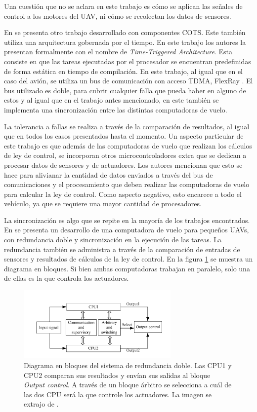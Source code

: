 Una cuestión que no se aclara en este trabajo es cómo se aplican las señales de control a los motores del UAV, ni cómo se recolectan los datos de sensores.

En \cite{zhang2020architecture} se presenta otro trabajo desarrollado con componentes COTS. Este también utiliza una arquitectura gobernada por el tiempo. En este trabajo los autores la presentan formalmente con el nombre de \textit{Time-Triggered Architecture}. Esta consiste en que las tareas ejecutadas por el procesador se encuentran predefinidas de forma estática en tiempo de compilación. En este trabajo, al igual que en el caso del avión, se utiliza un bus de comunicación con acceso TDMA, FlexRay \cite{nxpAN12233}. El bus utilizado es doble, para cubrir cualquier falla que pueda haber en alguno de estos y al igual que en el trabajo antes mencionado, en este también se implementa una sincronización entre las distintas computadoras de vuelo.

La tolerancia a fallas se realiza a través de la comparación de resultados, al igual que en todos los casos presentados hasta el momento. Un aspecto particular de este trabajo es que además de las computadoras de vuelo que realizan los cálculos de ley de control, se incorporan otros microcontroladores extra que se dedican a procesar datos de sensores y de actuadores. Los autores mencionan que esto se hace para alivianar la cantidad de datos enviados a través del bus de comunicaciones y el procesamiento que deben realizar las computadoras de vuelo para calcular la ley de control. Como aspecto negativo, esto encarece a todo el vehículo, ya que se requiere una mayor cantidad de procesadores.

La sincronización es algo que se repite en la mayoría de los trabajos encontrados. En \cite{zhang2015dual} se presenta un desarrollo de una computadora de vuelo para pequeños UAVs, con redundancia doble y sincronización en la ejecución de las tareas. La redundancia también se administra a través de la comparación de entradas de sensores y resultados de cálculos de la ley de control. En la figura \ref{fig:FCC_dual_FPGA} se muestra un diagrama en bloques. Si bien ambas computadoras trabajan en paralelo, solo una de ellas es la que controla los actuadores. 

\begin{figure}[H]
    \centering
    \includegraphics[width=0.7\textwidth]{img/FCC_dual_FPGA.png}
    \caption{Diagrama en bloques del sistema de redundancia doble. Las CPU1 y CPU2 comparan sus resultados y envían sus salidas al bloque \textit{Output control}. A través de un bloque árbitro se selecciona a cuál de las dos CPU será la que controle los actuadores. La imagen se extrajo de \cite{zhang2015dual}.}
    \label{fig:FCC_dual_FPGA}
\end{figure}

